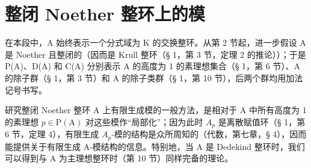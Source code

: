 \section{整闭 Noether 整环上的模}

在本段中，A 始终表示一个分式域为 K 的交换整环。从第 2 节起，进一步假设 A 是 Noether 且整闭的（因而是 Krull 整环（§ 1，第 3 节，定理 2 的推论））；于是 P(A)、D(A) 和 C(A) 分别表示 A 的高度为 1 的素理想集合（§ 1，第 6 节）、A 的除子群（§ 1，第 3 节）和 A 的除子类群（§ 1，第 10 节），后两个群均用加法记号书写。

研究整闭 Noether 整环 A 上有限生成模的一般方法，是相对于 A 中所有高度为 1 的素理想 \(p \in \mathrm{P}(\mathrm{A})\) 对这些模作``局部化''；因为此时 \(A_{p}\) 是离散赋值环（§ 1，第 6 节，定理 4），有限生成 \(A_{p}\)-模的结构是众所周知的（代数，第七章，§ 4），因而能提供关于有限生成 A-模结构的信息。特别地，当 A 是 Dedekind 整环时，我们可以得到与 A 为主理想整环时（第 10 节）同样完备的理论。

